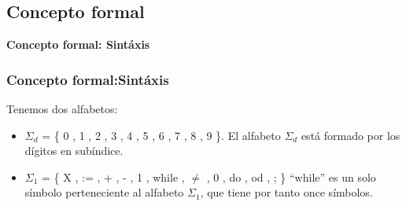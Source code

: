 \documentclass[xcolor=table]{beamer}
\begin{document}

\subsection{Concepto formal}

\begin{frame}  \Large

\begin{center}
    \textbf{Concepto formal: Sintáxis}
\end{center}

\end{frame} 

\begin{frame}[fragile]\frametitle{Concepto formal:Sintáxis} \small  

Tenemos dos alfabetos:
\begin{itemize}
    \item $\Sigma_d$ = \{ 0 , 1 , 2 , 3 , 4 , 5 , 6 , 7 , 8 , 9 \}. El alfabeto $\Sigma_d$ está formado por los dígitos en subíndice.

    \item $\Sigma_1$ = \{ X , := , + , - , 1 , while , $\neq$ , 0 , do , od , ; \} ``while'' es un solo símbolo perteneciente al alfabeto $\Sigma_1$, que tiene por tanto once símbolos.
\end{itemize}


\end{frame}
\end{document}
